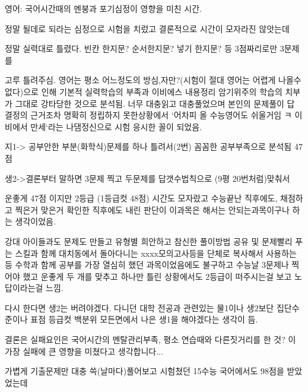 영어: 국어시간때의 멘붕과 포기심정이 영향을 미친 시간.
\vspace{5mm}

정말 될데로 되라는 심정으로 시험을 치렀고 결론적으로 시간이 모자라진 않앗는데
\vspace{5mm}

정말 실력대로 틀렸다. 빈칸 한지문? 순서한지문? 넣기 한지문? 등 3점짜리로만 3문제를
\vspace{5mm}

고루 틀려주심. 영어는 평소 어느정도의 방심,자만?(시험이 절대 영어는 어렵게 나올수 없다)으로 인해 기본적 실력학습의 부족과 이비에스 내용정리 암기위주의 학습의 치부가 그대로 강타당한 것으로 분석됨. 너무 대충읽고 대충풀었으며 본인의 문제풀이 답 결정의 근거조차 명확히 정립하지 못한상황에서 `어차피 올 수능영어도 쉬울거임 ㅋ 이비에서 만세`라는 나댐정신으로 시험 응시한 꼴이 되었음.
\vspace{5mm}

지1-> 공부안한 부분(화학식)문제를 하나 틀려서(2번) 꼼꼼한 공부부족으로 분석됨 47점
\vspace{5mm}

생2->결론부터 말하면 3문제 찍고 두문제를 답갯수법칙으로 (9평 20번처럼)맞춰서
\vspace{5mm}

운좋게 47점 이지만 2등급 (1등급컷 48점) 시간도 모자랐고 수능끝난 직후에도, 채점하고 찍은거 맞은거 확인한 직후에도 내린 판단이 이과목은 해서는 안되는과목이구나 하는 생각이었음.
\vspace{5mm}

강대 아이들과도 문제도 만들고 유형별 희안하고 참신한 풀이방법 공유 및 문제빨리 푸는 스킬과 함께 대치동에서 돌아다니는 xxxx모의고사등을 단체로 복사해서 사용하는등 수학과 함께 공부를 가장 열심히 했던 과목이었음에도 불구하고 수능날 3문제나 찍어야 했고 운좋게 두 개를 맞추고 하나만 틀린 상황에서도 2등급이 떠주시는걸 보고 노답이라는걸 느낌.
\vspace{5mm}

다시 한다면 생2는 버려야겠다. 다니던 대학 전공과 관련있는 물1이나 생2보단 집단수준이나 표점 등급컷 백분위 모든면에서 나은 생1을 해야겠다는 생각이 듬.
\vspace{5mm}

결론은 실패요인은 국어시간의 멘탈관리부족, 평소 연습때와 다른짓거리를 한 것? 이 가장 실패에 큰 영향을 미쳤다고 생각합니다...
\vspace{5mm}

가볍게 기출문제만 대충 쓱(날마다)풀어보고 시험쳤던 15수능 국어에서도 98점을 받았었는데
\vspace{5mm}

